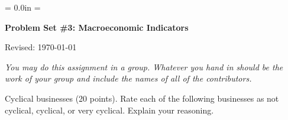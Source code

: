 \documentclass[12pt]{exam}
\def\HeadName{Problem Set \#3}
\begin{document}
\parindent = 0.0in
\parskip = \bigskipamount
\thispagestyle{empty}%
\Head

\centerline{\large \bf \HeadName: Macroeconomic Indicators}
\centerline{Revised:  \today}

\medskip
{\it You may do this assignment in a group.
Whatever you hand in should be the work of your group
and include the names of all of the contributors.}

\begin{questions}
\question Cyclical businesses (20 points).
Rate each of the following businesses
as not cyclical, cyclical, or very cyclical.
Explain your reasoning.

\begin{solution}
\end{solution}


\end{questions}
\end{document}
